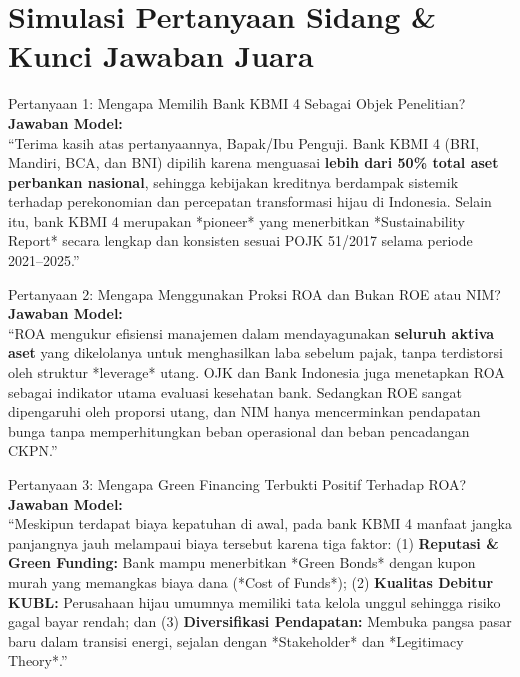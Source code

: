 \documentclass[11pt,a4paper]{article}
\begin{document}
\newpage
\section{Simulasi Pertanyaan Sidang \& Kunci Jawaban Juara}

\begin{qnabox}{Pertanyaan 1: Mengapa Memilih Bank KBMI 4 Sebagai Objek Penelitian?}
\textbf{Jawaban Model:}\\
``Terima kasih atas pertanyaannya, Bapak/Ibu Penguji. Bank KBMI 4 (BRI, Mandiri, BCA, dan BNI) dipilih karena menguasai \textbf{lebih dari 50\% total aset perbankan nasional}, sehingga kebijakan kreditnya berdampak sistemik terhadap perekonomian dan percepatan transformasi hijau di Indonesia. Selain itu, bank KBMI 4 merupakan *pioneer* yang menerbitkan *Sustainability Report* secara lengkap dan konsisten sesuai POJK 51/2017 selama periode 2021--2025.''
\end{qnabox}

\begin{qnabox}{Pertanyaan 2: Mengapa Menggunakan Proksi ROA dan Bukan ROE atau NIM?}
\textbf{Jawaban Model:}\\
``ROA mengukur efisiensi manajemen dalam mendayagunakan \textbf{seluruh aktiva aset} yang dikelolanya untuk menghasilkan laba sebelum pajak, tanpa terdistorsi oleh struktur *leverage* utang. OJK dan Bank Indonesia juga menetapkan ROA sebagai indikator utama evaluasi kesehatan bank. Sedangkan ROE sangat dipengaruhi oleh proporsi utang, dan NIM hanya mencerminkan pendapatan bunga tanpa memperhitungkan beban operasional dan beban pencadangan CKPN.''
\end{qnabox}

\begin{qnabox}{Pertanyaan 3: Mengapa Green Financing Terbukti Positif Terhadap ROA?}
\textbf{Jawaban Model:}\\
``Meskipun terdapat biaya kepatuhan di awal, pada bank KBMI 4 manfaat jangka panjangnya jauh melampaui biaya tersebut karena tiga faktor: (1) \textbf{Reputasi \& Green Funding:} Bank mampu menerbitkan *Green Bonds* dengan kupon murah yang memangkas biaya dana (*Cost of Funds*); (2) \textbf{Kualitas Debitur KUBL:} Perusahaan hijau umumnya memiliki tata kelola unggul sehingga risiko gagal bayar rendah; dan (3) \textbf{Diversifikasi Pendapatan:} Membuka pangsa pasar baru dalam transisi energi, sejalan dengan *Stakeholder* dan *Legitimacy Theory*.''
\end{qnabox}
\end{document}
